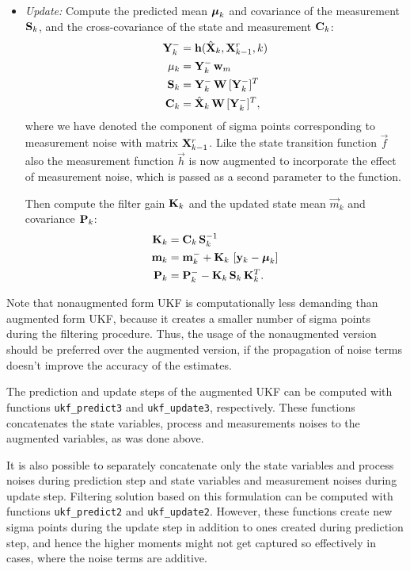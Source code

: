 \begin{itemize}
%
\item {\em Update:} Compute the predicted mean $\boldsymbol{\mu}_k$ and
covariance of the measurement $\mathbf{S}_k$, and the cross-covariance of
the state and measurement $\mathbf{C}_k$:
%
\begin{equation}
\begin{split} \mathbf{Y}^-_k &=
\mathbf{h}(\hat{\mathbf{X}}_k,\mathbf{X}^r_{k-1},k) \\ \mathbf{\mu}_k &=
\mathbf{Y}^-_k \, \mathbf{w}_m \\ \mathbf{S}_k &= \mathbf{Y}^-_k \, \mathbf{W} \,
[\mathbf{Y}^-_k]^T \\ \mathbf{C}_k &= \hat{\mathbf{X}}_k \, \mathbf{W} \,
[\mathbf{Y}^-_k]^T,
\end{split}
\label{eq:ukf2_update1}
\end{equation}
%
where we have denoted the component of sigma points corresponding to
measurement noise with matrix $\mathbf{X}^r_{k-1}$. Like the state
transition function $\vec{f}$ also the measurement function $\vec{h}$
is now augmented to incorporate the effect of measurement noise, which
is passed as a second parameter to the function.

Then compute the filter gain $\mathbf{K}_k$ and the updated state mean
$\vec{m}_k$ and covariance $\mathbf{P}_k$:
%
\begin{equation}
\begin{split} \mathbf{K}_k &= \mathbf{C}_k \, \mathbf{S}_k^{-1} \\ \mathbf{m}_k &=
\mathbf{m}^-_k + \mathbf{K}_k \, \left[ \mathbf{y}_k - \boldsymbol{\mu}_k \right] \\
\mathbf{P}_k &= \mathbf{P}^-_k - \mathbf{K}_k \, \mathbf{S}_k \, \mathbf{K}_k^T.
\end{split}
\label{eq:ukf2_update2}
\end{equation}
\end{itemize}
%

Note that nonaugmented form UKF is computationally less demanding than
augmented form UKF, because it creates a smaller number of sigma
points during the filtering procedure. Thus, the usage of the
nonaugmented version should be preferred over the augmented
version, if the propagation of noise terms doesn't improve the
accuracy of the estimates.

The prediction and update steps of the augmented UKF can be computed
with functions \texttt{ukf\_predict3} and \texttt{ukf\_update3},
respectively. These functions concatenates the state variables,
process and measurements noises to the augmented variables, as was
done above.

It is also possible to separately concatenate only the state variables
and process noises during prediction step and state variables and
measurement noises during update step. Filtering solution based on
this formulation can be computed with functions \texttt{ukf\_predict2}
and \texttt{ukf\_update2}. However, these functions create new sigma
points during the update step in addition to ones created during
prediction step, and hence the higher moments might not get captured
so effectively in cases, where the noise terms are additive.



